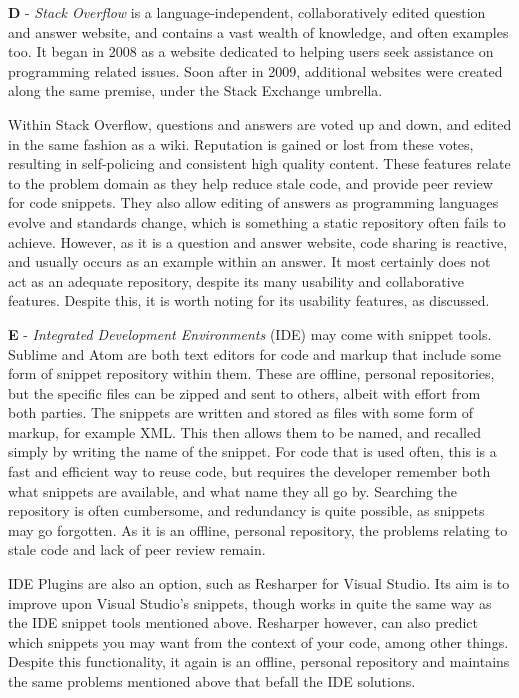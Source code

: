 \textbf{D} - \textit{Stack Overflow} is a language-independent, collaboratively edited question and answer website, and contains a vast wealth of knowledge, and often examples too.
It began in 2008 as a website dedicated to helping users seek assistance on programming related issues.
Soon after in 2009, additional websites were created along the same premise, under the Stack Exchange umbrella.

Within Stack Overflow, questions and answers are voted up and down, and edited in the same fashion as a wiki.
Reputation is gained or lost from these votes, resulting in self-policing and consistent high quality content.
These features relate to the problem domain as they help reduce stale code, and provide peer review for code snippets.
They also allow editing of answers as programming languages evolve and standards change, which is something a static repository often fails to achieve.
However, as it is a question and answer website, code sharing is reactive, and usually occurs as an example within an answer.
It most certainly does not act as an adequate repository, despite its many usability and collaborative features.
Despite this, it is worth noting for its usability features, as discussed.

\textbf{E} - \textit{Integrated Development Environments} (IDE) may come with snippet tools.
Sublime and Atom are both text editors for code and markup that include some form of snippet repository within them.
These are offline, personal repositories, but the specific files can be zipped and sent to others, albeit with effort from both parties.
The snippets are written and stored as files with some form of markup, for example XML.
This then allows them to be named, and recalled simply by writing the name of the snippet.
For code that is used often, this is a fast and efficient way to reuse code, but requires the developer remember both what snippets are available, and what name they all go by.
Searching the repository is often cumbersome, and redundancy is quite possible, as snippets may go forgotten.
As it is an offline, personal repository, the problems relating to stale code and lack of peer review remain.

IDE Plugins are also an option, such as Resharper for Visual Studio.
Its aim is to improve upon Visual Studio's snippets, though works in quite the same way as the IDE snippet tools mentioned above.
Resharper however, can also predict which snippets you may want from the context of your code, among other things.
Despite this functionality, it again is an offline, personal repository and maintains the same problems mentioned above that befall the IDE solutions.

